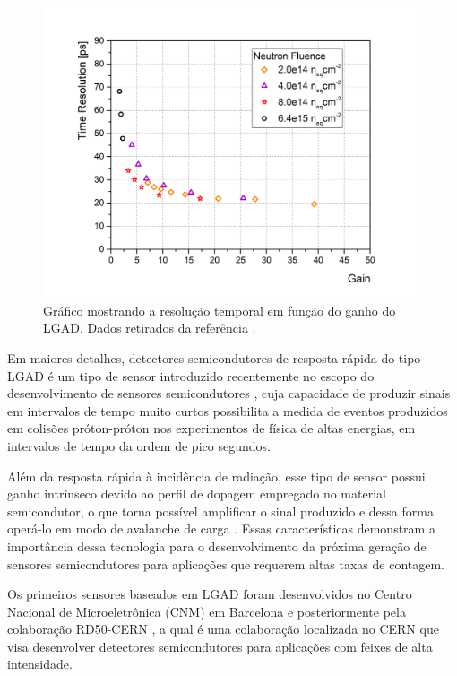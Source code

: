 \begin{figure} 
    \centering
    \includegraphics[width=12.0cm]{assets/timeresolution_vs_gain.png}
    \caption{ Gráfico mostrando a resolução temporal em função do ganho do LGAD. Dados retirados da referência \cite{tdr}.}
    \label{timeresolution}
\end{figure}

Em maiores detalhes, detectores semicondutores de resposta rápida do tipo LGAD é um tipo de sensor  introduzido recentemente no escopo do desenvolvimento de sensores semicondutores \cite{JIN_LGAD,NIMA_LGAD}, cuja capacidade de produzir sinais em intervalos de tempo muito curtos possibilita a medida de eventos produzidos em colisões próton-próton nos experimentos de física de altas energias, em intervalos de tempo da ordem de pico segundos. 

Além da resposta rápida à incidência de radiação, esse tipo de sensor possui ganho intrínseco devido ao perfil de dopagem empregado no material semicondutor, o que torna possível amplificar o sinal produzido e dessa forma operá-lo em modo de avalanche de carga \cite{JIN_LGAD,NIMA_LGAD}. Essas características demonstram a importância dessa tecnologia para o desenvolvimento da próxima geração de sensores semicondutores para aplicações que requerem altas taxas de contagem.

Os primeiros sensores baseados em LGAD foram desenvolvidos no Centro Nacional de Microeletrônica (CNM) em Barcelona e posteriormente pela colaboração RD50-CERN \cite{tdr,JIN_LGAD,NIMA_LGAD}, a qual é uma colaboração localizada no CERN que visa desenvolver detectores semicondutores para aplicações com feixes de alta intensidade.%

